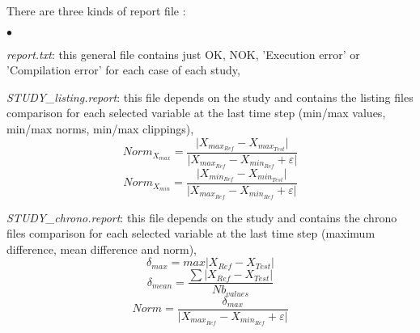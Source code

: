 There are three kinds of report file : 
\begin{list}{$\bullet$}{}
\item {\it report.txt}: this general file contains just OK, NOK, 
      'Execution error' or 'Compilation error' for each case of
      each study,
\item {\it STUDY\_listing.report}: this file depends on the study
      and contains the listing files comparison for each selected 
      variable at the last time step (min/max values, min/max norms, 
      min/max clippings),
      $$Norm_{X_{max}}=\frac{\vert{X_{max_{Ref}}-X_{max_{Test}}}\vert}{\vert{X_{max_{Ref}}-X_{min_{Ref}}}+\varepsilon\vert}$$
      $$Norm_{X_{min}}=\frac{\vert{X_{min_{Ref}}-X_{min_{Test}}}\vert}{\vert{X_{max_{Ref}}-X_{min_{Ref}}}+\varepsilon\vert}$$
\item {\it STUDY\_chrono.report}: this file depends on the study
      and contains the chrono files comparison for each selected
      variable at the last time step (maximum difference, mean 
      difference and norm),
      $$\delta_{max}= max \vert{X_{Ref}-X_{Test}\vert}$$
      $$\delta_{mean}= \frac{\sum \vert{X_{Ref}-X_{Test}}\vert}{Nb_{values}} $$
      $$Norm = \frac{\delta_{max}}{\vert{X_{max_{Ref}}-X_{min_{Ref}}}+\varepsilon\vert}$$
      
\end{list} 
